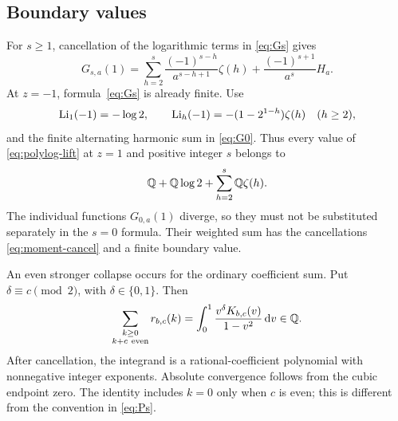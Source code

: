 \subsection{Boundary values}

For $s\ge1$, cancellation of the logarithmic terms in \eqref{eq:Gs} gives
\begin{equation}\label{eq:G1}
 G_{s,a}(1)=
 \sum_{h=2}^{s}\frac{(-1)^{s-h}}{a^{s-h+1}}\zeta(h)
 +\frac{(-1)^{s+1}}{a^s}H_a.
\end{equation}
At $z=-1$, formula~\eqref{eq:Gs} is already finite. Use
\[
 \operatorname{Li}_1(-1)=-\log2,\qquad
 \operatorname{Li}_h(-1)=-(1-2^{1-h})\zeta(h)\quad(h\ge2),
\]
and the finite alternating harmonic sum in \eqref{eq:G0}. Thus every value of \eqref{eq:polylog-lift} at $z=1$ and positive integer $s$ belongs to
\[
 \mathbb Q+\mathbb Q\log2+\sum_{h=2}^{s}\mathbb Q\zeta(h).
\]
The individual functions $G_{0,a}(1)$ diverge, so they must not be substituted separately in the $s=0$ formula. Their weighted sum has the cancellations \eqref{eq:moment-cancel} and a finite boundary value.

An even stronger collapse occurs for the ordinary coefficient sum. Put $\delta\equiv c\pmod2$, with $\delta\in\{0,1\}$. Then
\begin{equation}\label{eq:rational-collapse}
 \sum_{\substack{k\ge0\\k+c\ \mathrm{even}}}r_{b,c}(k)
 =\int_0^1\frac{v^\delta K_{b,c}(v)}{1-v^2}\,\mathrm d v\in\mathbb Q.
\end{equation}
After cancellation, the integrand is a rational-coefficient polynomial with nonnegative integer exponents. Absolute convergence follows from the cubic endpoint zero. The identity includes $k=0$ only when $c$ is even; this is different from the convention in \eqref{eq:Ps}.
